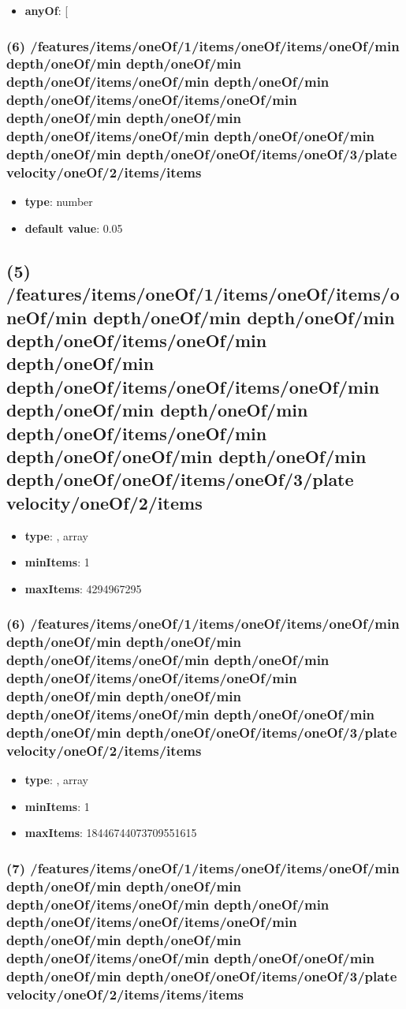 \begin{itemize}[leftmargin=6em]\item {\bf anyOf}: [\end{itemize}\subsubsection{(6) /features/items/oneOf/1/items/oneOf/items/oneOf/min depth/oneOf/min depth/oneOf/min depth/oneOf/items/oneOf/min depth/oneOf/min depth/oneOf/items/oneOf/items/oneOf/min depth/oneOf/min depth/oneOf/min depth/oneOf/items/oneOf/min depth/oneOf/oneOf/min depth/oneOf/min depth/oneOf/oneOf/items/oneOf/3/plate velocity/oneOf/2/items/items}
\begin{itemize}[leftmargin=6em]\item {\bf type}: number\item {\bf default value}: 0.05
\end{itemize}\subsection{(5) /features/items/oneOf/1/items/oneOf/items/oneOf/min depth/oneOf/min depth/oneOf/min depth/oneOf/items/oneOf/min depth/oneOf/min depth/oneOf/items/oneOf/items/oneOf/min depth/oneOf/min depth/oneOf/min depth/oneOf/items/oneOf/min depth/oneOf/oneOf/min depth/oneOf/min depth/oneOf/oneOf/items/oneOf/3/plate velocity/oneOf/2/items}
\begin{itemize}[leftmargin=5em]\item {\bf type}: , array\item {\bf minItems}: 1
\item {\bf maxItems}: 4294967295
\end{itemize}\subsubsection{(6) /features/items/oneOf/1/items/oneOf/items/oneOf/min depth/oneOf/min depth/oneOf/min depth/oneOf/items/oneOf/min depth/oneOf/min depth/oneOf/items/oneOf/items/oneOf/min depth/oneOf/min depth/oneOf/min depth/oneOf/items/oneOf/min depth/oneOf/oneOf/min depth/oneOf/min depth/oneOf/oneOf/items/oneOf/3/plate velocity/oneOf/2/items/items}
\begin{itemize}[leftmargin=6em]\item {\bf type}: , array\item {\bf minItems}: 1
\item {\bf maxItems}: 18446744073709551615
\end{itemize}\subsubsection{(7) /features/items/oneOf/1/items/oneOf/items/oneOf/min depth/oneOf/min depth/oneOf/min depth/oneOf/items/oneOf/min depth/oneOf/min depth/oneOf/items/oneOf/items/oneOf/min depth/oneOf/min depth/oneOf/min depth/oneOf/items/oneOf/min depth/oneOf/oneOf/min depth/oneOf/min depth/oneOf/oneOf/items/oneOf/3/plate velocity/oneOf/2/items/items/items}

